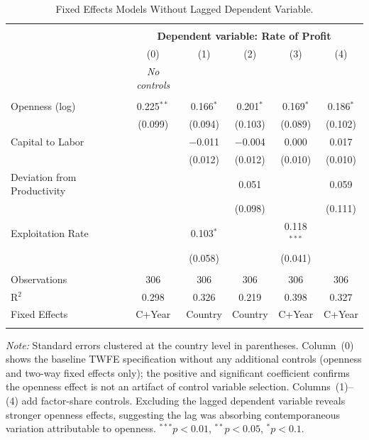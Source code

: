 \documentclass[10pt]{article}
\begin{document}
\par 
\begin{table}[!htbp]
  \centering
  \caption{Fixed Effects Models Without Lagged Dependent Variable.}
  \label{table:without_lag}
  \begin{tabular}{@{\extracolsep{4pt}}lccccc}
  \\[-1.8ex]\hline
  \hline \\[-1.8ex]
   & \multicolumn{5}{c}{\textbf{Dependent variable: Rate of Profit}} \\
   & (0) & (1) & (2) & (3) & (4) \\
   & \textit{No controls} & & & & \\
  \hline \\[-1.8ex]
  Openness (log) & 0.225$^{**}$ & 0.166$^{*}$ & 0.201$^{*}$ & 0.169$^{*}$ & 0.186$^{*}$ \\
   & (0.099) & (0.094) & (0.103) & (0.089) & (0.102) \\
  Capital to Labor &  & $-$0.011 & $-$0.004 & 0.000 & 0.017 \\
   &  & (0.012) & (0.012) & (0.010) & (0.010) \\
  Deviation from Productivity &  &  & 0.051 &  & 0.059 \\
   &  &  & (0.098) &  & (0.111) \\
  Exploitation Rate &  & 0.103$^{*}$ &  & 0.118$^{***}$ &  \\
   &  & (0.058) &  & (0.041) &  \\
  \hline \\[-1.8ex]
  Observations & 306 & 306 & 306 & 306 & 306 \\
  R$^{2}$ & 0.298 & 0.326 & 0.219 & 0.398 & 0.327 \\
  Fixed Effects & C+Year & Country & Country & C+Year & C+Year \\
  \hline
  \hline \\[-1.8ex]
  \end{tabular}
  \begin{minipage}[t]{\textwidth}
  \small
  \textit{Note:} Standard errors clustered at the country level in parentheses. Column~(0) shows the baseline TWFE specification without any additional controls (openness and two-way fixed effects only); the positive and significant coefficient confirms the openness effect is not an artifact of control variable selection. Columns~(1)--(4) add factor-share controls. Excluding the lagged dependent variable reveals stronger openness effects, suggesting the lag was absorbing contemporaneous variation attributable to openness. $^{***}p<0.01$, $^{**}p<0.05$, $^{*}p<0.1$.
  \end{minipage}
\end{table}
\end{document}
